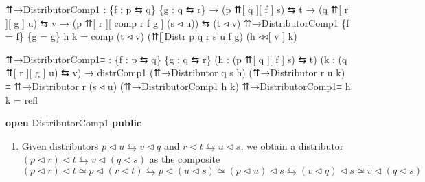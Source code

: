 \documentclass[
  11pt,
  oneside,
  article]{memoir}
\newenvironment{Shaded}{}{}
\newcommand{\KeywordTok}[1]{\textcolor[rgb]{0.00,0.44,0.13}{\textbf{#1}}}
\newcommand{\NormalTok}[1]{#1}
\newcommand{\OtherTok}[1]{\textcolor[rgb]{0.00,0.44,0.13}{#1}}
\providecommand{\tightlist}{%
  \setlength{\itemsep}{0pt}\setlength{\parskip}{0pt}}
\theoremstyle{definition}
\theoremstyle{plain}
\newcommand{\0}{\textsf{0}}
\newcommand{\1}{\tn{\textsf{1}}}
\begin{document}
\begin{Shaded}
\begin{Highlighting}[]
\NormalTok{    ⇈→DistributorComp1 }\OtherTok{:} 
        \OtherTok{\{}\NormalTok{f }\OtherTok{:}\NormalTok{ p ⇆ q}\OtherTok{\}} \OtherTok{\{}\NormalTok{g }\OtherTok{:}\NormalTok{ q ⇆ r}\OtherTok{\}} 
        \OtherTok{→} \OtherTok{(}\NormalTok{p ⇈[ q ][ f ] s}\OtherTok{)}\NormalTok{ ⇆ t }
        \OtherTok{→} \OtherTok{(}\NormalTok{q ⇈[ r ][ g ] u}\OtherTok{)}\NormalTok{ ⇆ v}
        \OtherTok{→} \OtherTok{(}\NormalTok{p ⇈[ r ][ comp r f g ] }\OtherTok{(}\NormalTok{s ◃ u}\OtherTok{))}\NormalTok{ ⇆ }\OtherTok{(}\NormalTok{t ◃ v}\OtherTok{)}
\NormalTok{    ⇈→DistributorComp1 }\OtherTok{\{}\NormalTok{f }\OtherTok{=}\NormalTok{ f}\OtherTok{\}} \OtherTok{\{}\NormalTok{g }\OtherTok{=}\NormalTok{ g}\OtherTok{\}}\NormalTok{ h k }\OtherTok{=} 
\NormalTok{        comp }\OtherTok{(}\NormalTok{t ◃ v}\OtherTok{)} \OtherTok{(}\NormalTok{⇈[]Distr p q r s u f g}\OtherTok{)} 
             \OtherTok{(}\NormalTok{h ◃◃[ v ] k}\OtherTok{)}

\NormalTok{    ⇈→DistributorComp1≡ }\OtherTok{:} 
        \OtherTok{\{}\NormalTok{f }\OtherTok{:}\NormalTok{ p ⇆ q}\OtherTok{\}} \OtherTok{\{}\NormalTok{g }\OtherTok{:}\NormalTok{ q ⇆ r}\OtherTok{\}} 
        \OtherTok{(}\NormalTok{h }\OtherTok{:} \OtherTok{(}\NormalTok{p ⇈[ q ][ f ] s}\OtherTok{)}\NormalTok{ ⇆ t}\OtherTok{)}
        \OtherTok{(}\NormalTok{k }\OtherTok{:} \OtherTok{(}\NormalTok{q ⇈[ r ][ g ] u}\OtherTok{)}\NormalTok{ ⇆ v}\OtherTok{)}
        \OtherTok{→}\NormalTok{ distrComp1 }\OtherTok{(}\NormalTok{⇈→Distributor q s h}\OtherTok{)} \OtherTok{(}\NormalTok{⇈→Distributor r u k}\OtherTok{)}
\NormalTok{          ≡ ⇈→Distributor r }\OtherTok{(}\NormalTok{s ◃ u}\OtherTok{)} \OtherTok{(}\NormalTok{⇈→DistributorComp1 h k}\OtherTok{)}
\NormalTok{    ⇈→DistributorComp1≡ h k }\OtherTok{=}\NormalTok{ refl}
    
\KeywordTok{open}\NormalTok{ DistributorComp1 }\KeywordTok{public}
\end{Highlighting}
\end{Shaded}

\begin{enumerate}
\def\labelenumi{\arabic{enumi}.}
\setcounter{enumi}{1}
\tightlist
\item
  Given distributors
  \(p \triangleleft u \leftrightarrows v \triangleleft q\) and
  \(r \triangleleft t \leftrightarrows u \triangleleft s\), we obtain a
  distributor
  \((p \triangleleft r) \triangleleft t \leftrightarrows v \triangleleft (q \triangleleft s)\)
  as the composite \[
  (p \triangleleft r) \triangleleft t \simeq p \triangleleft (r \triangleleft t) \leftrightarrows p \triangleleft (u \triangleleft s) \simeq (p \triangleleft u) \triangleleft s \leftrightarrows (v \triangleleft q) \triangleleft s \simeq v \triangleleft (q \triangleleft s)
  \]
\end{enumerate}
\end{document}
